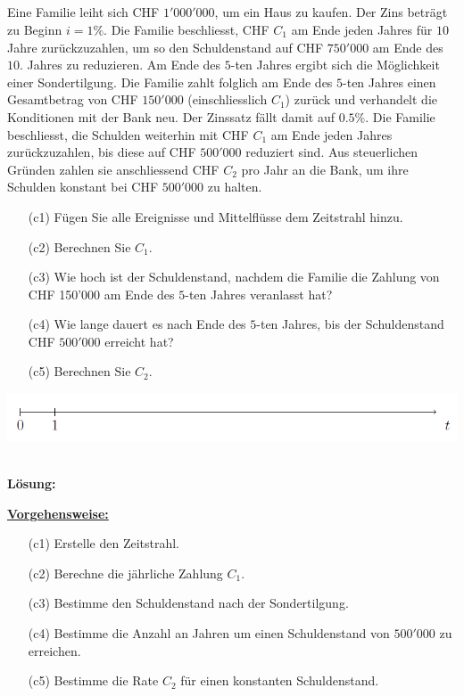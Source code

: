 \subsection*{}
Eine Familie leiht sich CHF $ 1'000'000 $, um ein Haus zu kaufen.
Der Zins beträgt zu Beginn $ i = 1 \% $.
Die Familie beschliesst, CHF $ C_1 $ am Ende jeden Jahres für $ 10 $ Jahre zurückzuzahlen, um so den Schuldenstand auf CHF $ 750'000 $ am Ende des $ 10. $ Jahres zu reduzieren.
Am Ende des $ 5 $-ten Jahres ergibt sich die Möglichkeit einer Sondertilgung.
Die Familie zahlt folglich am Ende des $ 5 $-ten Jahres einen Gesamtbetrag von CHF $ 150'000 $ (einschliesslich $ C_1 $) zurück und verhandelt die Konditionen mit der Bank neu.
Der Zinssatz fällt damit auf $ 0.5 \% $.
Die Familie beschliesst, die Schulden weiterhin mit CHF $ C_1 $ am Ende jeden Jahres zurückzuzahlen, bis diese auf CHF $ 500'000 $ reduziert sind.
Aus steuerlichen Gründen zahlen sie anschliessend CHF $ C_2 $ pro Jahr an die Bank,
um ihre Schulden konstant bei CHF $ 500'000 $ zu halten.
\begin{enumerate}
	\item[(c1)]
	Fügen Sie alle Ereignisse und Mittelflüsse dem Zeitstrahl hinzu.
	\item[(c2)] 
	Berechnen Sie $ C_1 $.
	\item[(c3)] Wie hoch ist der Schuldenstand, nachdem die Familie die Zahlung von CHF 150'000 am Ende des $ 5 $-ten Jahres veranlasst hat?
	\item[(c4)] 
	Wie lange dauert es nach Ende des $ 5 $-ten Jahres, bis der Schuldenstand CHF $ 500'000 $ erreicht hat?
	\item[(c5)]
	Berechnen Sie $ C_2 $.
\end{enumerate}
\begin{center}
	\includegraphics[scale=0.6]{pictures/zeitstrahl_1_c}
\end{center}
\ \\
\textbf{Lösung:}
\begin{mdframed}
	\underline{\textbf{Vorgehensweise:}}
	\begin{enumerate}
		\item[(c1)] Erstelle den Zeitstrahl.
		\item[(c2)] Berechne die jährliche Zahlung $ C_1 $.
		\item[(c3)] Bestimme den Schuldenstand nach der Sondertilgung.
		\item[(c4)] Bestimme die Anzahl an Jahren um einen Schuldenstand von $ 500'000 $ zu erreichen.
		\item[(c5)] Bestimme die Rate $ C_2 $ für einen konstanten Schuldenstand.
	\end{enumerate}
\end{mdframed}

